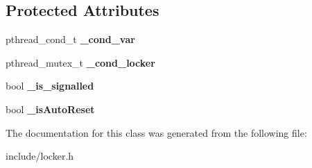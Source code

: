 \subsection*{Protected Attributes}
\begin{DoxyCompactItemize}
\item 
pthread\+\_\+cond\+\_\+t {\bfseries \+\_\+cond\+\_\+var}\hypertarget{class_event_acf1cb5e02dbbb2d32319f1f60f1cb9fa}{}\label{class_event_acf1cb5e02dbbb2d32319f1f60f1cb9fa}

\item 
pthread\+\_\+mutex\+\_\+t {\bfseries \+\_\+cond\+\_\+locker}\hypertarget{class_event_a151be53028faee4d60620cca190df90b}{}\label{class_event_a151be53028faee4d60620cca190df90b}

\item 
bool {\bfseries \+\_\+is\+\_\+signalled}\hypertarget{class_event_afdbb004c4e19a444aebf79b4745c2c76}{}\label{class_event_afdbb004c4e19a444aebf79b4745c2c76}

\item 
bool {\bfseries \+\_\+is\+Auto\+Reset}\hypertarget{class_event_a7f609b99f6132b957a68324b3f80441b}{}\label{class_event_a7f609b99f6132b957a68324b3f80441b}

\end{DoxyCompactItemize}


The documentation for this class was generated from the following file\+:\begin{DoxyCompactItemize}
\item 
include/locker.\+h\end{DoxyCompactItemize}
